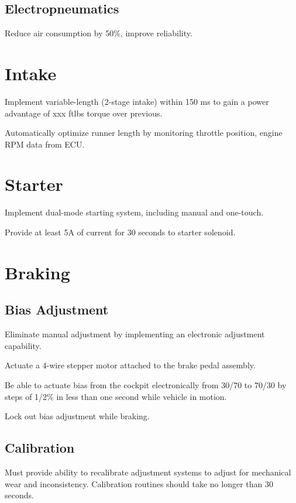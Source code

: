 \subsection{Electropneumatics}

Reduce air consumption by 50\%, improve reliability. 


\section{Intake}

Implement variable-length (2-stage intake) within 150 ms to gain a
power advantage of xxx ftlbs torque over previous.

Automatically optimize runner length by monitoring throttle position,
engine RPM data from ECU.


\section{Starter}

Implement dual-mode starting system, including manual and one-touch.

Provide at least 5A of current for 30 seconds to starter solenoid.


\section{Braking}


\subsection{Bias Adjustment}

Eliminate manual adjustment by implementing an electronic adjustment
capability. 

Actuate a 4-wire stepper motor attached to the brake pedal assembly.

Be able to actuate bias from the cockpit electronically from 30/70
to 70/30 by steps of 1/2\% in less than one second while vehicle in
motion.

Lock out bias adjustment while braking.


\subsection{Calibration}

Must provide ability to recalibrate adjustment systems to adjust for
mechanical wear and inconsistency. Calibration routines should take
no longer than 30 seconds. 


